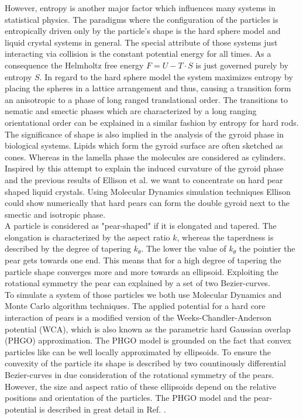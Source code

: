\documentclass[epj,twocolumn]{webofc}
\begin{document}
However, entropy is another major factor which influences many systems in statistical physics. The paradigms where the configuration of the particles is entropically driven only by the particle's shape is the hard sphere model and 
liquid crystal systems in general. The special attribute of those systems just interacting via collision is the constant potential energy for all times. As a consequence the Helmholtz free energy $F=U-T\cdot S$ is just governed purely 
by entropy $S$. In regard to the hard sphere model the system maximizes entropy by placing the spheres in a lattice arrangement and thus, causing a transition form an anisotropic to a phase of long ranged translational order. The 
transitions to nematic and smectic phases which are characterized by a long ranging orientational order can be explained in a similar fashion by entropy for hard rods.\\

The significance of shape is also implied in the analysis of the gyroid phase in biological systems. Lipids which form the gyroid surface are often sketched as cones. Whereas in the lamella phase the molecules are considered as
cylinders. Inspired by this attempt to explain the induced curvature of the gyroid phase and the previous results of Ellison et al. \cite{} we want to concentrate on hard pear shaped liquid crystals. Using Molecular Dynamics 
simulation techniques Ellison could show numerically that hard pears can form the double gyroid next to the smectic and isotropic phase.\\

A particle is considered as "pear-shaped" if it is elongated and tapered. The elongation is characterized by the aspect ratio $k$, whereas the taperdness is described by the degree of tapering $k_{\theta}$. The lower the value of 
$k_{\theta}$ the pointier the pear gets towards one end. This means that for a high degree of tapering the particle shape converges more and more towards an ellipsoid. Exploiting the rotational symmetry the pear can explained by 
a set of two Bezier-curves.\\

To simulate a system of those particles we both use Molecular Dynamics and Monte Carlo algorithm techniques. The applied potential for a hard core interaction of pears is a modified version of the Weeks-Chandler-Anderson 
potential (WCA), which is also known as the parametric hard Gaussian overlap (PHGO) approximation. The PHGO model is grounded on the fact that convex particles like can be well locally approximated by ellipsoids. To ensure 
the convexity of the particle its shape is described by two countinously differential Bezier-curves in due consideration of the rotational symmetry of the pears. However, the size and aspect ratio of these ellipsoids depend on the 
relative positions and orientation of the particles. The PHGO model and the pear-potential is described in great detail in Ref. \cite{}.
\end{document}
